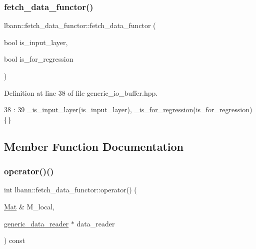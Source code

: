 \subsubsection{\texorpdfstring{fetch\+\_\+data\+\_\+functor()}{fetch\_data\_functor()}}
{\footnotesize\ttfamily lbann\+::fetch\+\_\+data\+\_\+functor\+::fetch\+\_\+data\+\_\+functor (\begin{DoxyParamCaption}\item[{bool}]{is\+\_\+input\+\_\+layer,  }\item[{bool}]{is\+\_\+for\+\_\+regression }\end{DoxyParamCaption})\hspace{0.3cm}{\ttfamily [inline]}}



Definition at line 38 of file generic\+\_\+io\+\_\+buffer.\+hpp.


\begin{DoxyCode}
38                                                                    :
39     \hyperlink{classlbann_1_1fetch__data__functor_a8cc5a064d51a0a42e5a43c82ba576e67}{\_is\_input\_layer}(is\_input\_layer), \hyperlink{classlbann_1_1fetch__data__functor_a8946419e8dc9374216f8aa6bbc365b14}{\_is\_for\_regression}(is\_for\_regression)
       \{\}
\end{DoxyCode}


\subsection{Member Function Documentation}
\mbox{\label{classlbann_1_1fetch__data__functor_ae1320d9ad90983b03bbabac9bb6d0748}} 
\subsubsection{\texorpdfstring{operator()()}{operator()()}}
{\footnotesize\ttfamily int lbann\+::fetch\+\_\+data\+\_\+functor\+::operator() (\begin{DoxyParamCaption}\item[{\hyperlink{base_8hpp_a68f11fdc31b62516cb310831bbe54d73}{Mat} \&}]{M\+\_\+local,  }\item[{\hyperlink{classlbann_1_1generic__data__reader}{generic\+\_\+data\+\_\+reader} $\ast$}]{data\+\_\+reader }\end{DoxyParamCaption}) const\hspace{0.3cm}{\ttfamily [inline]}}



